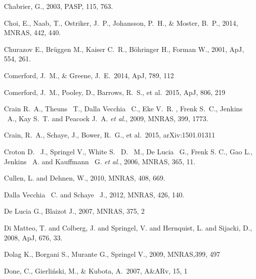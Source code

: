 \documentclass[a4paper,fleqn,usenatbib,letter]{mnras}
\begin{document}
\begin{thebibliography}{99}
Chabrier, G., 2003, PASP, 115, 763.

Choi, E., Naab, T., Ostriker, J.~P., Johansson, P.~H., \& Moster, B.~P., 2014, MNRAS, 442, 440.

Churazov E., Br{\"u}ggen M., Kaiser C.~R., B{\"o}hringer H., Forman W., 2001, ApJ, 554, 261. 

Comerford, J.~M., \& Greene, J.~E.\ 2014, ApJ, 789, 112 



Comerford, J.~M., Pooley, D., Barrows, R.~S., et al.\ 2015, ApJ, 806, 219 

Crain R.~A., Theuns ~T., Dalla Vecchia ~C., Eke V.~R. , Frenk S.~C., Jenkins ~A., Kay S.~T. and Peacock J.~A. {\it et al.}, 2009, MNRAS,  399, 1773.

Crain, R.~A., Schaye, J., Bower, R.~G., et al.\ 2015, arXiv:1501.01311 

Croton D. ~J., Springel V., White S. ~D. ~M., De Lucia ~G., Frenk S. C., Gao L., Jenkins ~A. and Kauffmann ~G. {\it et al.}, 2006, MNRAS, 365, 11.

Cullen, L. and Dehnen, W., 2010, MNRAS, 408, 669.  


Dalla Vecchia  ~C. and Schaye ~J., 2012, MNRAS, 426, 140.




De Lucia G., Blaizot J., 2007, MNRAS, 375, 2


Di Matteo, T. and Colberg, J. and Springel, V. and Hernquist, L. and  Sijacki, D., 2008, ApJ, 676, 33.

Dolag K., Borgani S., Murante G., Springel V., 2009, MNRAS,399, 497

Done, C., Gierli{\'n}ski, M., \& Kubota, A.\ 2007, A\&ARv, 15, 1


\end{thebibliography}
\end{document}
